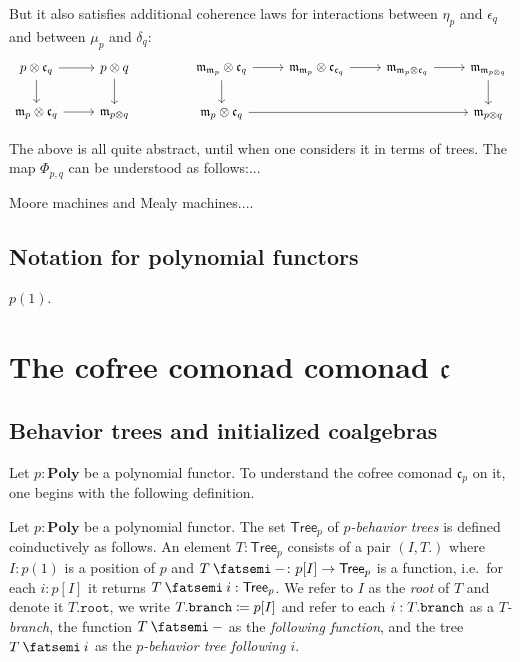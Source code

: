 \documentclass[11pt, one side, article]{memoir}
\theoremstyle{definition}
\theoremstyle{plain}
\newenvironment{definition}
  {\pushQED{\qed}\renewcommand{\qedsymbol}{$\lozenge$}\definitionx}
  {\popQED\enddefinitionx}
\newcommand{\Set}[1]{\mathsf{#1}}%
\newcommand{\Cat}[1]{\mathbf{#1}}%
\newcommand{\then}{\mathbin{\fatsemi}}
\newcommand{\tn}[1]{\textnormal{#1}}
\newcommand{\poly}{\Cat{Poly}}
\newcommand{\free}{\mathfrak{m}}
\newcommand{\cofree}{\mathfrak{c}}
\newcommand{\tree}{\Set{Tree}}
\newcommand{\rt}{\texttt{root}}
\newcommand{\br}{\tn{\texttt{branch}}}
\begin{document}
But it also satisfies additional coherence laws for interactions between $\eta_p$ and $\epsilon_q$ and between $\mu_p$ and $\delta_q$:
\[
\begin{tikzcd}
  p\otimes\cofree_q\ar[r]\ar[d]&p\otimes q\ar[d]\\
  \free_p\otimes\cofree_q\ar[r]&\free_{p\otimes q}
\end{tikzcd}
\hspace{.6in}
\begin{tikzcd}
	\free_{\free_p}\otimes\cofree_q\ar[d]\ar[r]&
	\free_{\free_p}\otimes\cofree_{\cofree_q}\ar[r]&
	\free_{\free_p\otimes\cofree_q}\ar[r]&
	\free_{\free_{p\otimes q}}\ar[d]\\
	\free_p\otimes\cofree_q\ar[rrr]&&&
	\free_{p\otimes q}
\end{tikzcd}
\]


The above is all quite abstract, until when one considers it in terms of trees. The map $\Phi_{p,q}$ can be understood as follows:...



Moore machines and Mealy machines....

\section{Notation for polynomial functors}

$p(1)$.

\chapter{The cofree comonad comonad $\cofree$}

\section{Behavior trees and initialized coalgebras}

Let $p:\poly$ be a polynomial functor. To understand the cofree comonad $\cofree_p$ on it, one begins with the following definition.

\begin{definition}
Let $p:\poly$ be a polynomial functor. The set $\tree_p$ of \emph{$p$-behavior trees} is defined coinductively as follows. An element $T:\tree_p$ consists of a pair $(I,T.)$ where $I:p(1)$ is a position of $p$ and $T\then -\colon p[I]\to\tree_p$ is a function, i.e.\ for each $i:p[I]$ it returns $T\then i:\tree_p$. 
We refer to $I$ as the \emph{root} of $T$ and denote it $T.\rt$, we write $T.\br\coloneqq p[I]$ and refer to each $i:T.\br$ as a \emph{$T$-branch}, the function $T\then-$ as the \emph{following function}, and the tree $T\then i$ as the \emph{$p$-behavior tree following $i$}.
\end{definition}
\end{document}
